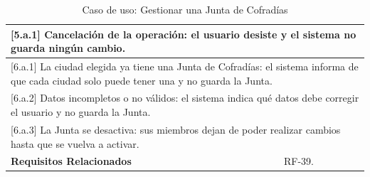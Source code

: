 \begin{table}[h!]
\begin{tabular}{|p{4cm}|p{11cm}|}
        \hline
        \multicolumn{2}{|p{15cm}|}{ [5.a.1] Cancelación de la operación: el usuario desiste y el sistema no guarda ningún cambio. } \\
        \hline
        \multicolumn{2}{|p{15cm}|}{ [6.a.1] La ciudad elegida ya tiene una Junta de Cofradías: el sistema informa de que cada ciudad solo puede tener una y no guarda la Junta. } \\
        \hline
        \multicolumn{2}{|p{15cm}|}{ [6.a.2] Datos incompletos o no válidos: el sistema indica qué datos debe corregir el usuario y no guarda la Junta. } \\
        \hline
        \multicolumn{2}{|p{15cm}|}{ [6.a.3] La Junta se desactiva: sus miembros dejan de poder realizar cambios hasta que se vuelva a activar. } \\
        \hline
        \textbf{Requisitos Relacionados} & RF-39. \\
        \hline
    \end{tabular}
    \caption{Caso de uso: Gestionar una Junta de Cofradías}
\end{table}

